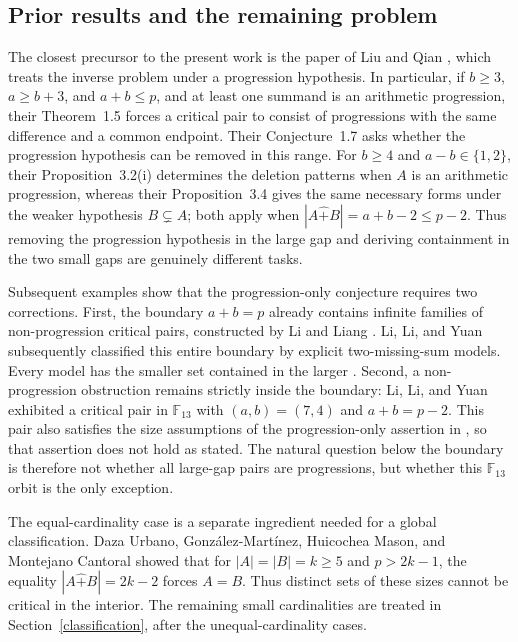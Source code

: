 \documentclass[12pt]{article}
\theoremstyle{remark}
\newcommand{\rs}{\mathbin{\widehat+}}
\begin{document}
\subsection{Prior results and the remaining problem}

The closest precursor to the present work is the paper of Liu and Qian
\cite{LQ}, which treats the inverse problem under a progression
hypothesis.  In particular, if $b\ge3$, $a\ge b+3$, and $a+b\le p$,
and at least one summand is an arithmetic progression, their
Theorem~1.5 forces a critical pair to consist of progressions with the
same difference and a common endpoint.  Their Conjecture~1.7 asks whether
the progression hypothesis can be removed in this range.
For $b\ge4$ and $a-b\in\{1,2\}$, their Proposition~3.2(i) determines
the deletion patterns when $A$ is an arithmetic progression, whereas
their Proposition~3.4 gives the same necessary forms under the weaker
hypothesis $B\subsetneq A$; both apply when
$|A\rs B|=a+b-2\le p-2$.
Thus removing the progression hypothesis in the large gap and deriving
containment in the two small gaps are genuinely different tasks.

Subsequent examples show that the progression-only conjecture requires
two corrections.  First, the boundary $a+b=p$ already contains infinite
families of non-progression critical pairs, constructed by Li and Liang
\cite[Theorems 2.1 and 2.3]{LL}.  Li, Li, and Yuan
\cite[Theorem 1.1]{HLY} subsequently classified this entire boundary
by explicit two-missing-sum models.  Every model has the smaller set
contained in the larger \cite[Proposition 3.2(i)]{HLY}.
Second, a non-progression obstruction remains strictly inside the boundary:
Li, Li, and Yuan \cite[Example 4.1]{HLY} exhibited a critical pair in
$\mathbb F_{13}$ with $(a,b)=(7,4)$ and $a+b=p-2$.  This pair also satisfies
the size assumptions of the progression-only assertion in
\cite[Theorem 3.1, version 2]{LL}, so that assertion does not hold as
stated.  The natural question below the boundary is therefore not whether
all large-gap pairs are progressions, but whether this $\mathbb F_{13}$
orbit is the only exception.

The equal-cardinality case is a separate ingredient needed for a global
classification.  Daza Urbano, Gonz\'alez-Mart\'inez, Huicochea Mason, and
Montejano Cantoral \cite[Theorem 7]{DGHM} showed that for
$|A|=|B|=k\ge5$ and $p>2k-1$, the equality
$|A\rs B|=2k-2$ forces $A=B$.  Thus distinct sets of these sizes cannot be
critical in the interior.  The remaining small cardinalities are treated in
Section~\ref{classification}, after the unequal-cardinality cases.
\end{document}
